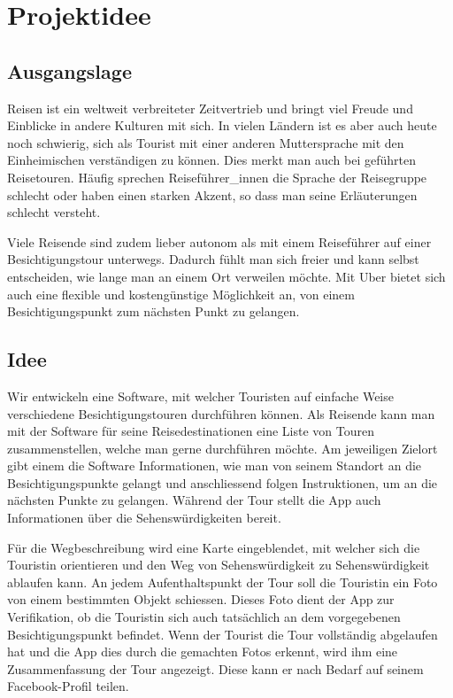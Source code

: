 \section{Projektidee}\label{Projektidee}
\subsection{Ausgangslage}\label{Ausgangslage}
Reisen ist ein weltweit verbreiteter Zeitvertrieb und bringt viel Freude und Einblicke in
andere Kulturen mit sich. In vielen Ländern ist es aber auch heute noch schwierig, sich als
Tourist mit einer anderen Muttersprache mit den Einheimischen verständigen zu können. Dies
merkt man auch bei geführten Reisetouren. Häufig sprechen Reiseführer\_innen die Sprache der
Reisegruppe schlecht oder haben einen starken Akzent, so dass man seine Erläuterungen schlecht versteht.

Viele Reisende sind zudem lieber autonom als mit einem Reiseführer auf einer Besichtigungstour
unterwegs. Dadurch fühlt man sich freier und kann selbst entscheiden, wie lange man an einem
Ort verweilen möchte. Mit Uber bietet sich auch eine flexible und kostengünstige Möglichkeit
an, von einem Besichtigungspunkt zum nächsten Punkt zu gelangen.

\subsection{Idee}\label{idee}
Wir entwickeln eine Software, mit welcher Touristen auf einfache Weise verschiedene Besichtigungstouren
durchführen können.
Als Reisende kann man mit der Software für seine Reisedestinationen eine Liste von Touren
zusammenstellen, welche man gerne durchführen möchte. Am jeweiligen Zielort gibt einem die
Software Informationen, wie man von seinem Standort an die Besichtigungspunkte gelangt und
anschliessend folgen Instruktionen, um an die nächsten Punkte zu gelangen. Während der Tour
stellt die App auch Informationen über die Sehenswürdigkeiten bereit.

Für die Wegbeschreibung wird eine Karte eingeblendet, mit welcher sich die Touristin orientieren
und den Weg von Sehenswürdigkeit zu Sehenswürdigkeit ablaufen kann. An jedem Aufenthaltspunkt
der Tour soll die Touristin ein Foto von einem bestimmten Objekt schiessen. Dieses Foto dient
der App zur Verifikation, ob die Touristin sich auch tatsächlich an dem vorgegebenen
Besichtigungspunkt befindet. Wenn der Tourist die Tour vollständig abgelaufen hat und die App
dies durch die gemachten Fotos erkennt, wird ihm eine Zusammenfassung der Tour angezeigt. Diese
kann er nach Bedarf auf seinem Facebook-Profil teilen.

